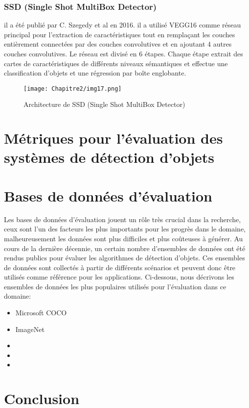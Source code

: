           
     \subsubsection{SSD (Single Shot MultiBox Detector)} \cite{ssd_paper}
     il a été publié par C. Szegedy et al en 2016. il a utilisé VEGG16 comme réseau principal pour l'extraction de caractéristiques tout en remplaçant les couches entièrement connectées par des couches convolutives et en ajoutant 4 autres couches convolutives. Le réseau est divisé en 6 étapes. Chaque étape extrait des cartes de caractéristiques de différents niveaux sémantiques et effectue une classification d'objets et une régression par boîte englobante.
     \begin{figure}[H]
          \centering
          \texttt{[image: Chapitre2/img17.png]}
          \caption{Architecture de SSD (Single Shot MultiBox Detector)}
          \label{img17}
          \end{figure}

\section{Métriques pour l'évaluation des systèmes de détection d'objets} 

\section{Bases de données d'évaluation} 
Les bases de données d'évaluation jouent un rôle très crucial dans la recherche, ceux sont l'un des facteurs les plus importants pour les progrès dans le domaine, malheureusement les données sont plus difficiles et plus coûteuses à générer. Au cours de la dernière décennie, un certain nombre d'ensembles de données ont été rendus publics pour évaluer les algorithmes de détection d'objets. Ces ensembles de données sont collectés à partir de différents scénarios et peuvent donc être utilisés comme référence pour les applications. Ci-dessous, nous décrivons les ensembles de données  les plus populaires utilisés pour l'évaluation dans ce domaine:

\begin{itemize}
\item Microsoft COCO \cite{db1}

\item ImageNet \cite{db2}
\item 
\item 
\item 
\end{itemize}



\section{Conclusion} 
